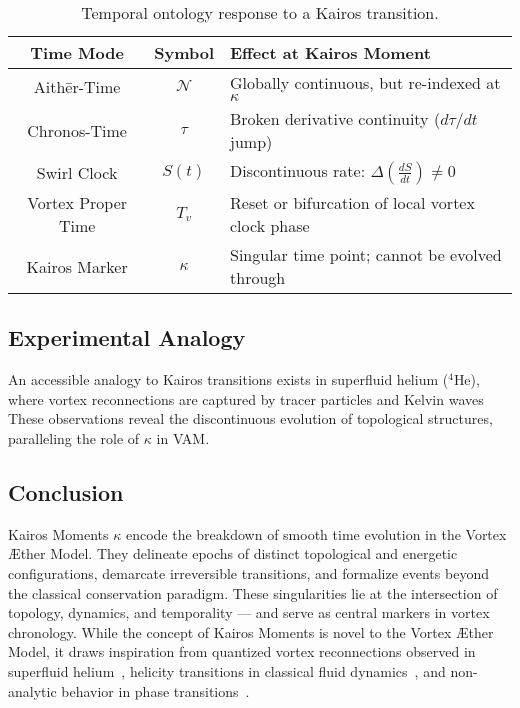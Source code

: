 \documentclass[12pt]{article}
\begin{document}
    \begin{table}[H]
        \centering
        \renewcommand{\arraystretch}{1.3}
        \begin{tabular}{|c|c|p{9cm}|}
            \hline
            \textbf{Time Mode} & \textbf{Symbol} & \textbf{Effect at Kairos Moment} \\
            \hline
            Aithēr-Time & \( \mathcal{N} \) & Globally continuous, but re-indexed at \(\kappa\) \\
            Chronos-Time & \( \tau \) & Broken derivative continuity (\( d\tau/dt \) jump) \\
            Swirl Clock & \( S(t) \) & Discontinuous rate: \( \Delta \left(\frac{dS}{dt}\right) \neq 0 \) \\
            Vortex Proper Time & \( T_v \) & Reset or bifurcation of local vortex clock phase \\
            Kairos Marker & \( \kappa \) & Singular time point; cannot be evolved through \\
            \hline
        \end{tabular}
        \caption{Temporal ontology response to a Kairos transition.}
    \end{table}


    \subsection{Experimental Analogy}
    An accessible analogy to Kairos transitions exists in superfluid helium (\(^4\)He), where vortex reconnections are captured by tracer
    particles and Kelvin waves~\cite{bewley2006} These observations reveal the discontinuous evolution of topological structures, paralleling the role of \( \kappa \) in VAM.

    \subsection*{Conclusion}
    Kairos Moments \( \kappa \) encode the breakdown of smooth time evolution in the Vortex Æther Model. They delineate epochs of distinct
    topological and energetic configurations, demarcate irreversible transitions, and formalize events beyond the classical conservation paradigm. These singularities lie at the intersection of topology, dynamics, and temporality — and serve as central markers in vortex chronology. While the concept of Kairos Moments is novel to the Vortex Æther Model, it draws inspiration from quantized vortex reconnections observed in superfluid helium~\cite{bewley2006}, helicity transitions in classical fluid dynamics~\cite{moffatt1969}, and non-analytic behavior in phase transitions~\cite{landau1959}.







    \ifdefined\standalonechapter
    \else
    
    
    
\end{document}
